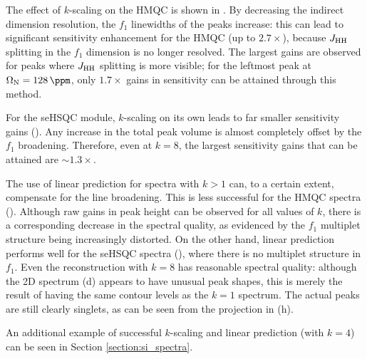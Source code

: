 The effect of $k$-scaling on the HMQC is shown in .
By decreasing the indirect dimension resolution, the $f_1$ linewidths of the peaks increase: this can lead to significant sensitivity enhancement for the HMQC (up to $2.7 \times$), because $\jhh$ splitting in the $f_1$ dimension is no longer resolved.
The largest gains are observed for peaks where $\jhh$ splitting is more visible; for the leftmost peak at $\Omega_{\ce{N}} = \SI{128}{\ppm}$, only $1.7 \times$ gains in sensitivity can be attained through this method.

For the seHSQC module, $k$-scaling on its own leads to far smaller sensitivity gains ().
Any increase in the total peak volume is almost completely offset by the $f_1$ broadening.
Therefore, even at $k = 8$, the largest sensitivity gains that can be attained are $\sim 1.3\times$.

The use of linear prediction for spectra with $k > 1$ can, to a certain extent, compensate for the line broadening.
This is less successful for the HMQC spectra ().
Although raw gains in peak height can be observed for all values of $k$, there is a corresponding decrease in the spectral quality, as evidenced by the $f_1$ multiplet structure being increasingly distorted.
On the other hand, linear prediction performs well for the seHSQC spectra (), where there is no multiplet structure in $f_1$.
Even the reconstruction with $k = 8$ has reasonable spectral quality: although the 2D spectrum (d) appears to have unusual peak shapes, this is merely the result of having the same contour levels as the $k = 1$ spectrum.
The actual peaks are still clearly singlets, as can be seen from the projection in (h).

An additional example of successful $k$-scaling and linear prediction (with $k = 4$) can be seen in Section \ref{section:si_spectra}.

